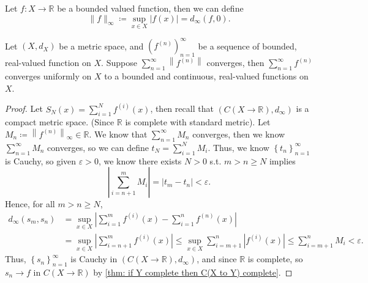 \begin{definition}
   Let \(f:X \to \mathbb{R} \) be a bounded valued function, then we can define 
   \[
    \lVert f \rVert_\infty \coloneqq  \sup _{x \in X} \vert f(x) \vert = d_\infty \left( f, 0 \right). 
   \]  
\end{definition}

\begin{theorem}
    Let \((X, d_X)\) be a metric space, and \(\left( f^{(n)} \right)_{n=1}^{\infty}  \) be a sequence of bounded, real-valued function on \(X\). Suppose \(\sum_{n=1}^{\infty} \left\lVert f^{(n)} \right\rVert  \) converges, then \(\sum_{n=1}^{\infty} f^{(n)} \) converges uniformly on \(X\) to a bounded and continuous, real-valued functions on \(X\).        
\end{theorem}
\begin{proof}
    Let \(S_N(x) = \sum_{i=1}^N f^{(i)}(x) \), then recall that \(\left( C(X \to \mathbb{R} ), d_\infty  \right) \) is a compact metric space. (Since \(\mathbb{R} \) is complete with standard metric). Let \(M_n \coloneqq \left\lVert f^{(n)} \right\rVert _\infty \in \mathbb{R}  \). We know that \(\sum_{n=1}^{\infty} M_n \) converges, then we know \(\sum_{n=1}^{\infty} M_n \) converges, so we can define \(t_N = \sum_{i=1}^N M_i \). Thus, we know \(\left\{ t_n \right\}_{n=1}^{\infty}  \) is Cauchy, so given \(\varepsilon > 0\), we know there exists \(N > 0\) s.t. \(m > n \ge N\) implies 
    \[
        \left\vert \sum_{i=n+1}^m M_i  \right\vert  = \left\vert t_m - t_n \right\vert < \varepsilon. 
    \] 
    Hence, for all \(m > n \ge N\), 
    \begin{align*}
        d_\infty \left( s_m, s_n \right) &= \sup _{x \in X} \left\vert \sum_{i=1}^m f^{(i)}(x) - \sum_{i=1}^n f^{(n)}(x)   \right\vert \\
        &= \sup _{x \in X} \left\vert \sum_{i=n+1}^m f^{(i)}(x) \right\vert \le \sup _{x \in X} \sum_{i=m+1}^n \left\vert f^{(i)}(x) \right\vert \le \sum_{i=m+1}^n M_i < \varepsilon.    
    \end{align*}    
    Thus, \(\left\{ s_n \right\}_{n=1}^{\infty}  \) is Cauchy in \(\left( C(X \to \mathbb{R} ), d_\infty  \right) \), and since \(\mathbb{R} \) is complete, so \(s_n \to f\) in \(C(X \to \mathbb{R} )\) by \autoref{thm: if Y complete then C(X to Y) complete}.       
\end{proof}


